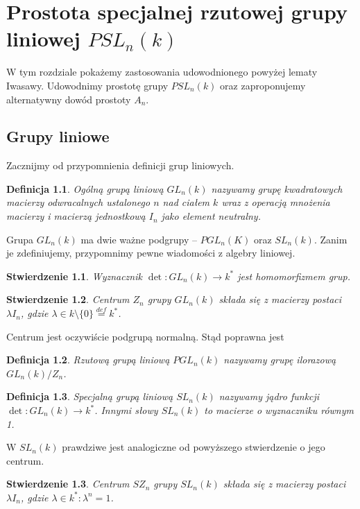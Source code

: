 \documentclass[licencjacka]{pracamgr}
\newtheorem{deff}{Definicja}[section]
\newtheorem{fact}{Stwierdzenie}[section]
\begin{document}
\chapter{Prostota specjalnej rzutowej grupy liniowej $PSL_n(k)$}

W tym rozdziale pokażemy zastosowania udowodnionego powyżej lematy Iwasawy.
Udowodnimy prostotę grupy $PSL_n(k)$ oraz zaproponujemy alternatywny dowód prostoty $A_n$.

\section{Grupy liniowe}

Zacznijmy od przypomnienia definicji grup liniowych.

\begin{deff}
  \emph{Ogólną grupą liniową $GL_n(k)$} nazywamy grupę kwadratowych macierzy odwracalnych 
  ustalonego $n$ nad ciałem $k$ wraz z operacją mnożenia macierzy i macierzą jednostkową $I_n$
  jako element neutralny.
\end{deff}

Grupa $GL_n(k)$ ma dwie ważne podgrupy -- $PGL_n(K)$ oraz $SL_n(k)$.
Zanim je zdefiniujemy, przypomnimy pewne wiadomości z algebry liniowej.

\begin{fact}
  Wyznacznik $\det \colon GL_n(k) \to k^*$ jest homomorfizmem grup.
\end{fact}

\begin{fact}
  Centrum $Z_n$ grupy $GL_n(k)$ składa się z macierzy postaci $\lambda I_n$, 
  gdzie $\lambda \in k \setminus \{0\} \stackrel{def}{=} k^*$.
\end{fact}

Centrum jest oczywiście podgrupą normalną. Stąd poprawna jest

\begin{deff}
  \emph{Rzutową grupą liniową $PGL_n(k)$} nazywamy grupę ilorazową $GL_n(k) / Z_n$.
\end{deff}

\begin{deff}
  \emph{Specjalną grupą liniową $SL_n(k)$} nazywamy jądro funkcji $\det \colon GL_n(k) \to k^*$.
  Innymi słowy $SL_n(k)$ to macierze o wyznaczniku równym 1.
\end{deff}

W $SL_n(k)$ prawdziwe jest analogiczne od powyższego stwierdzenie o jego centrum.

\begin{fact}
  Centrum $SZ_n$ grupy $SL_n(k)$ składa się z macierzy postaci $\lambda I_n$, 
  gdzie $\lambda \in k^* \colon \lambda^n = 1$.
\end{fact}
\end{document}
